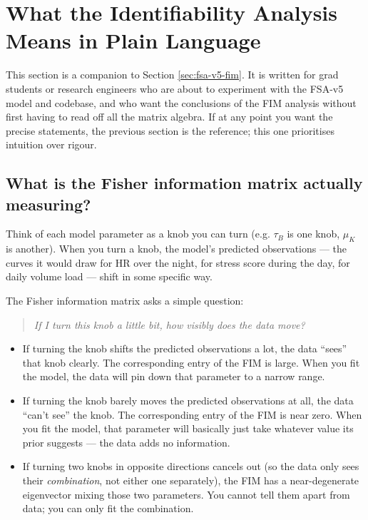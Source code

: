\section{What the Identifiability Analysis Means in Plain Language} \label{sec:fim-intuition}

This section is a companion to Section \ref{sec:fsa-v5-fim}. It is written for grad students or research engineers who are about to experiment with the FSA-v5 model and codebase, and who want the conclusions of the FIM analysis without first having to read off all the matrix algebra. If at any point you want the precise statements, the previous section is the reference; this one prioritises intuition over rigour.

\subsection{What is the Fisher information matrix actually measuring?}

Think of each model parameter as a knob you can turn (e.g. $\tau_B$ is one knob, $\mu_K$ is another). When you turn a knob, the model's predicted observations --- the curves it would draw for HR over the night, for stress score during the day, for daily volume load --- shift in some specific way.

The Fisher information matrix asks a simple question:

\begin{quote}
\emph{If I turn this knob a little bit, how visibly does the data move?}
\end{quote}

\begin{itemize}
  \item If turning the knob shifts the predicted observations a lot, the data ``sees'' that knob clearly. The corresponding entry of the FIM is large. When you fit the model, the data will pin down that parameter to a narrow range.
  \item If turning the knob barely moves the predicted observations at all, the data ``can't see'' the knob. The corresponding entry of the FIM is near zero. When you fit the model, that parameter will basically just take whatever value its prior suggests --- the data adds no information.
  \item If turning two knobs in opposite directions cancels out (so the data only sees their \emph{combination}, not either one separately), the FIM has a near-degenerate eigenvector mixing those two parameters. You cannot tell them apart from data; you can only fit the combination.
\end{itemize}

